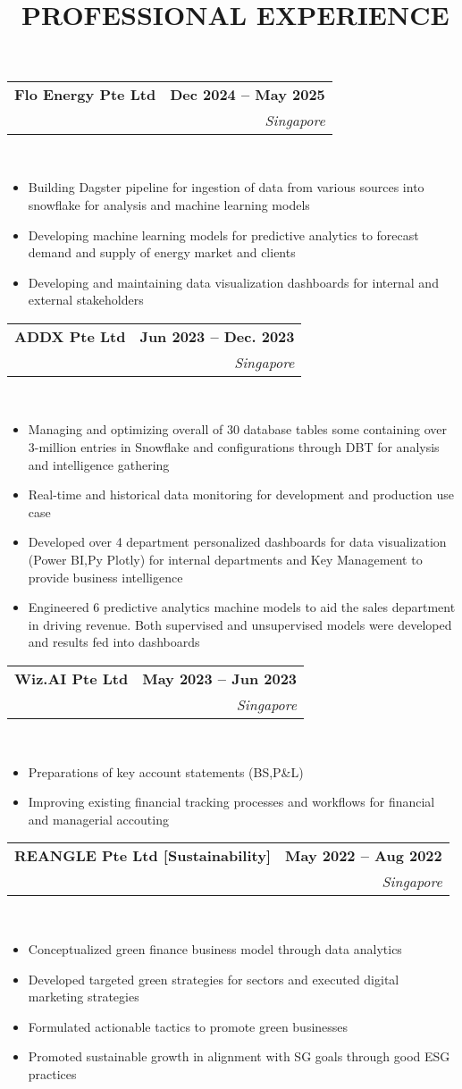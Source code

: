 \documentclass[10pt,a4paper]{article}
\makeatletter
\newcommand{\cvsectionfontsize}{11}       %
\newcommand{\cvtaglinefirstfontsize}{11}  %
\newcommand{\cvtaglinesecondfontsize}{10} %
\newcommand{\cvbulletfontsize}{10}        %
\newcommand{\cvsection}[3][.2em]{
  \vspace{-2.7em} %
  \section[#3]{\textbf{\scalebox{.68}{\faIcon{#2}}~\fontsize{\cvsectionfontsize}{\cvsectionfontsize}\selectfont\MakeUppercase{#3}}}
  \vspace{-1.8em}
  \noindent\makebox[\textwidth]{\rule{\textwidth}{0.4pt}}
  \\
  \vspace{#1} %
}
\newcommand{\cvtagline}[5][1em]{
  \vspace{-1em} %
  \noindent\begin{tabularx}{\textwidth}{@{}Xr@{}}
    {\fontsize{\cvtaglinefirstfontsize}{\cvtaglinefirstfontsize}\selectfont\textbf{#2}} & 
    {\fontsize{\cvtaglinefirstfontsize}{\cvtaglinefirstfontsize}\selectfont\textbf{#3}} \\ %
    {\fontsize{\cvtaglinesecondfontsize}{\cvtaglinesecondfontsize}\selectfont{#4}} & 
    {\fontsize{\cvtaglinesecondfontsize}{\cvtaglinesecondfontsize}\selectfont\textit{#5}} \\ %
  \end{tabularx}
  \\
  \vspace{#1} %
}
\newcommand{\cvbullets}[2][1em]{
  \vspace{-2.1em} %
  {\fontsize{\cvbulletfontsize}{\cvbulletfontsize}\selectfont
    \begin{itemize}[left=0pt,labelsep=1em]
      \setlength\itemsep{0.2em} %
      \setlength\labelwidth{1em} %
      \setlength\parskip{0pt} %
      #2
    \end{itemize}
  }
  \vspace{#1} %
}
\makeatother
\begin{document}
\cvsection{briefcase}{Professional Experience}

\cvtagline{Flo Energy Pte Ltd}{Dec 2024 -- May 2025}{Data Analytics $ | $ Supervisor: Nils [Data Lead]}{Singapore}

\cvbullets{
  \item Building Dagster pipeline for ingestion of data from various sources into
  snowflake for analysis and machine learning models
  \item Developing machine learning models for predictive analytics to forecast demand
  and supply of energy market and clients
  \item Developing and maintaining data visualization dashboards for internal and
  external stakeholders }

\cvtagline{ADDX Pte Ltd}{Jun 2023 -- Dec. 2023}{Data Analytics Intern $ | $ Supervisor: Yogesh [Data team lead]}{Singapore}

\cvbullets{
  \item Managing and optimizing overall of 30 database tables some containing over
  3-million entries in Snowflake and configurations through DBT for analysis and
  intelligence gathering
  \item Real-time and historical data monitoring for development and production use
  case
  \item Developed over 4 department personalized dashboards for data visualization
  (Power BI,Py Plotly) for internal departments and Key Management to provide
  business intelligence
  \item Engineered 6 predictive analytics machine models to aid the sales department in
  driving revenue. Both supervised and unsupervised models were developed and
  results fed into dashboards }

\cvtagline{Wiz.AI Pte Ltd}{May 2023 -- Jun 2023}{Finance Intern $ | $ Supervisor: Andy Teo [Finance director]}{Singapore}

\cvbullets{
  \item Preparations of key account statements (BS,P\&L)
  \item Improving existing financial tracking processes and workflows for financial and
  managerial accouting }

\cvtagline{REANGLE Pte Ltd [Sustainability]}{May 2022 -- Aug 2022}{Data Analyst Intern  $ | $ Supervisor: Kazu Watanabe [CEO]}{Singapore}

\cvbullets{
  \item Conceptualized green finance business model through data analytics
  \item Developed targeted green strategies for sectors and executed digital marketing
  strategies
  \item Formulated actionable tactics to promote green businesses
  \item Promoted sustainable growth in alignment with SG goals through good ESG
  practices }
\end{document}
